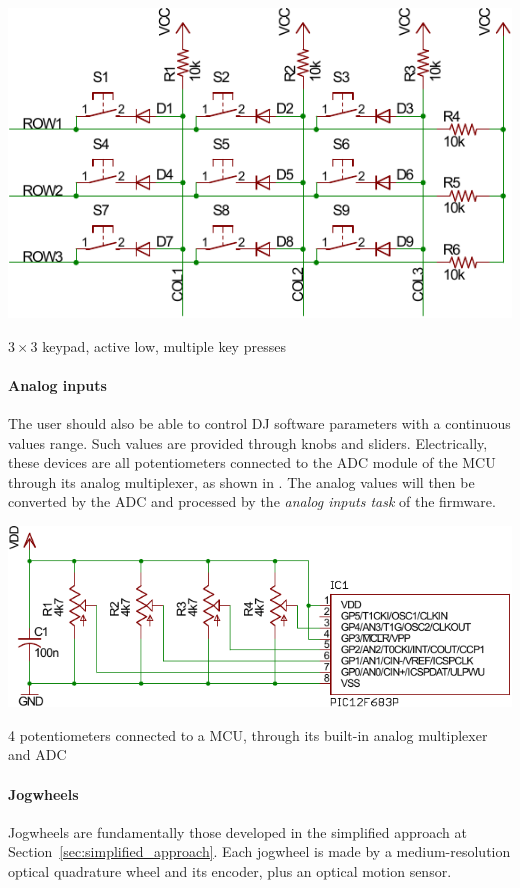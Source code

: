 \documentclass[a4paper,10pt]{article}
\makeatletter
\newenvironment{figurehere}{\def\@captype{figure}\vspace{2ex}}{\vspace{2ex}}
\makeatother
\begin{document}
\begin{multicols}{2}
\begin{figurehere}
	\centering
	\includegraphics[keepaspectratio=true,width=0.8\columnwidth]{images/keypad.pdf}
	\caption{$ 3 \times 3 $ keypad, active low, multiple key presses}
	\label{fig:keypad}
\end{figurehere}


\paragraph{Analog inputs}
The user should also be able to control DJ software parameters with a 
continuous values range. Such values are provided through knobs and sliders.
Electrically, these devices are all potentiometers connected to the ADC module
of the MCU through its analog multiplexer, as shown in .
The analog values will then be converted by the ADC and processed by the
\emph{analog inputs task} of the firmware.

\begin{figurehere}
	\centering
	\includegraphics[keepaspectratio=true,width=\columnwidth]{images/pots_mcu.pdf}
	\caption{4 potentiometers connected to a MCU, through its built-in analog
	multiplexer and ADC}
	\label{fig:pots_mcu}
\end{figurehere}


\paragraph{Jogwheels}
Jogwheels are fundamentally those developed in the simplified approach at
Section~\ref{sec:simplified_approach}. Each jogwheel is made by a
medium-resolution optical quadrature wheel and its encoder, plus an optical
motion sensor.


\end{multicols}
\end{document}
